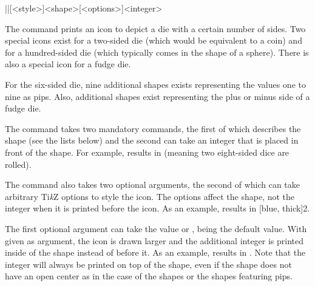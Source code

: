 \documentclass[a4paper]{article}
\begin{document}
\begin{macrodef}|\die|[<style>]{<shape>}[<options>]{<integer>}\end{macrodef}
The command \macro{\die} prints an icon to depict a die with a certain number of sides. Two special icons exist for a two-sided die (which would be equivalent to a coin) and for a hundred-sided die (which typically comes in the shape of a sphere). There is also a special icon for a fudge die. 

For the six-sided die, nine additional shapes exists representing the values one to nine as pips. Also, additional shapes exist representing the plus or minus side of a fudge die.

The command takes two mandatory commands, the first of which describes the shape (see the lists below) and the second can take an integer that is placed in front of the shape. For example,  results in  (meaning two eight-sided dice are rolled).

The command also takes two optional arguments, the second of which can take arbitrary Ti\emph{k}Z options to style the icon. The options affect the shape, not the integer when it is printed before the icon. As an example,  results in [blue, thick]{2}.

The first optional argument can take the value  or ,  being the default value. With  given as argument, the icon is drawn larger and the additional integer is printed inside of the shape instead of before it. As an example,  results in . Note that the integer will always be printed on top of the shape, even if the shape does not have an open center as in the case of the  shapes or the shapes featuring pips. 
\end{document}
